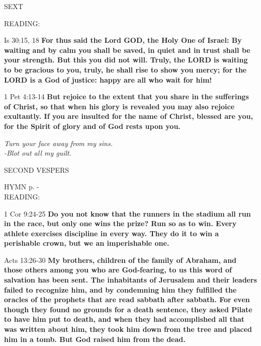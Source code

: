 \begin{flushleft}\normalsize{\uppercase{SEXT\\}}\end{flushleft}
\noindent READING:
\begin{description}[labelindent=\parindent, leftmargin=*]
\item [Week 1-4:]  Is 30:15, 18  \textbf{For thus said the Lord GOD, the Holy One of Israel: By waiting and by calm you shall be saved, in quiet and in trust shall be your strength. But this you did not will. Truly, the LORD is waiting to be gracious to you, truly, he shall rise to show you mercy; for the LORD is a God of justice: happy are all who wait for him!\\}

\item [Week 5:]  1 Pet 4:13-14  \textbf{But rejoice to the extent that you share in the sufferings of Christ, so that when his glory is revealed you may also rejoice exultantly. If you are insulted for the name of Christ, blessed are you, for the Spirit of glory and of God rests upon you.}
\end{description}

\begin{center}
\textit{Turn your face away from my sins.\\
-Blot out all my guilt.}\end{center}

\begin{flushleft}\normalsize{\uppercase{SECOND VESPERS\\}}\end{flushleft}
\noindent\small{\uppercase{HYMN} p. \pageref{lent:firstHymn}-\pageref{lent:lastHymn}\\}
\noindent READING:
\begin{description}[labelindent=\parindent, leftmargin=*]
\item [Week 1-4:]  1 Cor 9:24-25  \textbf{Do you not know that the runners in the stadium all run in the race, but only one wins the prize? Run so as to win. Every athlete exercises discipline in every way. They do it to win a perishable crown, but we an imperishable one.\\}
\item [Week 5:]  Acts 13:26-30   \textbf{My brothers, children of the family of Abraham, and those others among you who are God-fearing, to us this word of salvation has been sent. The inhabitants of Jerusalem and their leaders failed to recognize him, and by condemning him they fulfilled the oracles of the prophets that are read sabbath after sabbath. For even though they found no grounds for a death sentence, they asked Pilate to have him put to death, and when they had accomplished all that was written about him, they took him down from the tree and placed him in a tomb. But God raised him from the dead.}
\end{description}

